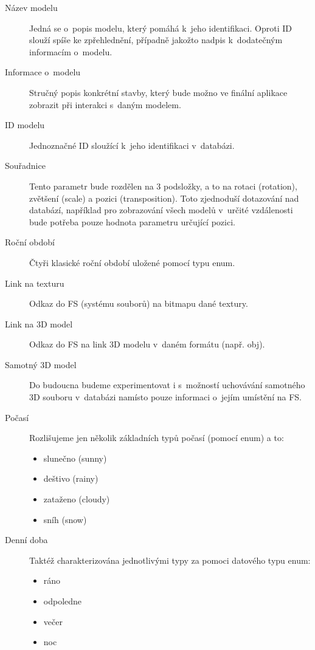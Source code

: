 \documentclass[thesis=B,czech]{FITthesis}[2012/06/26]
\begin{document}
	\begin{description}
		\item[Název modelu]
			Jedná se o~popis modelu, který pomáhá k~jeho identifikaci. Oproti ID slouží spíše ke zpřehlednění, případně jakožto nadpis k~dodatečným informacím o~modelu.

		\item[Informace o~modelu]
			Stručný popis konkrétní stavby, který bude možno ve finální aplikace zobrazit při interakci s~daným modelem.

		\item[ID modelu]
			Jednoznačné ID sloužící k~jeho identifikaci v~databázi.

		\item[Souřadnice]
			Tento parametr bude rozdělen na 3 podsložky, a to na rotaci (rotation), zvětšení (scale) a pozici (transposition). Toto zjednoduší dotazování nad databází, například pro zobrazování všech modelů v~určité vzdálenosti bude potřeba pouze hodnota parametru určující pozici.
			
		\item[Roční období]
			Čtyři klasické roční období uložené pomocí typu enum.

		\item[Link na texturu]
			Odkaz do FS (systému souborů) na bitmapu dané textury.

		\item[Link na 3D model]
			Odkaz do FS na link 3D modelu v~daném formátu (např. obj).

		\item[Samotný 3D model]
			Do budoucna budeme experimentovat i s~možností uchovávání samotného 3D souboru v~databázi namísto pouze informaci o~jejím umístění na FS.
			
		\item[Počasí]
			Rozlišujeme jen několik základních typů počasí (pomocí enum) a to:

	    	\begin{itemize}
    			\item slunečno (sunny)
    			\item deštivo (rainy)
    			\item zataženo (cloudy)
    			\item sníh (snow)
    		\end{itemize}

		\item[Denní doba]
			Taktéž charakterizována jednotlivými typy za pomoci datového typu enum:
	    	\begin{itemize}
    			\item ráno
    			\item odpoledne
    			\item večer
    			\item noc
    		\end{itemize}
			
	\end{description}
	
\end{document}
